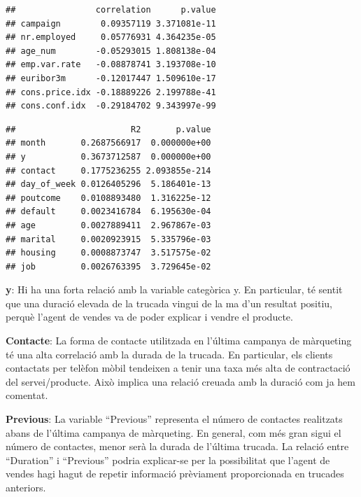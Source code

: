 \documentclass[
]{article}
\newenvironment{Shaded}{\begin{snugshade}}{\end{snugshade}}
\newcommand{\CommentTok}[1]{\textcolor[rgb]{0.56,0.35,0.01}{\textit{#1}}}
\newcommand{\NormalTok}[1]{#1}
\newcommand{\SpecialCharTok}[1]{\textcolor[rgb]{0.00,0.00,0.00}{#1}}
\begin{document}
\begin{Shaded}
\end{Shaded}

\begin{verbatim}
##                correlation      p.value
## campaign        0.09357119 3.371081e-11
## nr.employed     0.05776931 4.364235e-05
## age_num        -0.05293015 1.808138e-04
## emp.var.rate   -0.08878741 3.193708e-10
## euribor3m      -0.12017447 1.509610e-17
## cons.price.idx -0.18889226 2.199788e-41
## cons.conf.idx  -0.29184702 9.343997e-99
\end{verbatim}

\begin{Shaded}
\end{Shaded}

\begin{verbatim}
##                       R2       p.value
## month       0.2687566917  0.000000e+00
## y           0.3673712587  0.000000e+00
## contact     0.1775236255 2.093855e-214
## day_of_week 0.0126405296  5.186401e-13
## poutcome    0.0108893480  1.316225e-12
## default     0.0023416784  6.195630e-04
## age         0.0027889411  2.967867e-03
## marital     0.0020923915  5.335796e-03
## housing     0.0008873747  3.517575e-02
## job         0.0026763395  3.729645e-02
\end{verbatim}

\textbf{y}: Hi ha una forta relació amb la variable categòrica y. En
particular, té sentit que una duració elevada de la trucada vingui de la
ma d'un resultat positiu, perquè l'agent de vendes va de poder explicar
i vendre el producte.

\textbf{Contacte}: La forma de contacte utilitzada en l'última campanya
de màrqueting té una alta correlació amb la durada de la trucada. En
particular, els clients contactats per telèfon mòbil tendeixen a tenir
una taxa més alta de contractació del servei/producte. Això implica una
relació creuada amb la duració com ja hem comentat.

\textbf{Previous}: La variable ``Previous'' representa el número de
contactes realitzats abans de l'última campanya de màrqueting. En
general, com més gran sigui el número de contactes, menor serà la durada
de l'última trucada. La relació entre ``Duration'' i ``Previous'' podria
explicar-se per la possibilitat que l'agent de vendes hagi hagut de
repetir informació prèviament proporcionada en trucades anteriors.
\end{document}
